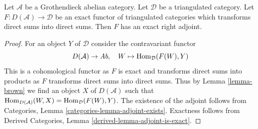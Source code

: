 \begin{proposition}
\label{proposition-brown}
Let $\mathcal{A}$ be a Grothendieck abelian category. Let $\mathcal{D}$
be a triangulated category. Let $F : D(\mathcal{A}) \to \mathcal{D}$ be an
exact functor of triangulated categories which transforms direct sums
into direct sums. Then $F$ has an exact right adjoint.
\end{proposition}

\begin{proof}
For an object $Y$ of $\mathcal{D}$ consider the contravariant functor
$$
D(\mathcal{A}) \to \textit{Ab},\quad
W \mapsto \mathop{\mathrm{Hom}}\nolimits_\mathcal{D}(F(W), Y)
$$
This is a cohomological functor as $F$ is exact and transforms direct sums
into products as $F$ transforms direct sums into direct sums. Thus by
Lemma \ref{lemma-brown} we find an object $X$ of $D(\mathcal{A})$ such that
$\mathop{\mathrm{Hom}}\nolimits_{D(\mathcal{A})}(W, X) = \mathop{\mathrm{Hom}}\nolimits_\mathcal{D}(F(W), Y)$.
The existence of the adjoint follows from
Categories, Lemma \ref{categories-lemma-adjoint-exists}.
Exactness follows from
Derived Categories, Lemma \ref{derived-lemma-adjoint-is-exact}.
\end{proof}


















